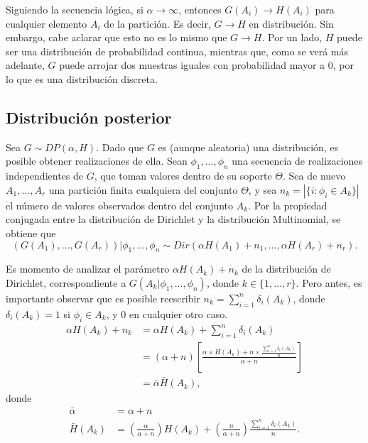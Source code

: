 Siguiendo la secuencia l\'ogica, si $\alpha \rightarrow \infty$, entonces $G(A_i) \rightarrow H(A_i)$ para cualquier elemento $A_i$ de la partici\'on. Es decir, $G \rightarrow H$ en distribuci\'on. Sin embargo, cabe aclarar que esto no es lo mismo que $G \rightarrow H$. Por un lado, $H$ puede ser una distribuci\'on de probabilidad continua, mientras que, como se ver\'a m\'as adelante, $G$ puede arrojar dos muestras iguales con probabilidad mayor a 0, por lo que es una distribuci\'on discreta.

\subsection{Distribuci\'on posterior}

Sea $G \sim DP(\alpha,H)$. Dado que $G$ es (aunque aleatoria) una distribuci\'on, es posible obtener realizaciones de ella. Sean $\phi_1,..., \phi_n$ una secuencia de realizaciones independientes de $G$, que toman valores dentro de su soporte $\Theta$. Sea de nuevo $A_1,...,A_r$ una partici\'on finita cualquiera del conjunto $\Theta$, y sea $n_k = |\{i: \phi_i \in A_k\}|$ el n\'umero de valores observados dentro del conjunto $A_k$. Por la propiedad conjugada entre la distribuci\'on de Dirichlet y la distribuci\'on Multinomial, se obtiene que
\begin{equation*}
   (G(A_1),...,G(A_r))|\phi_1,...,\phi_n \sim Dir(\alpha H(A_1) + n_1,...,\alpha H(A_r) + n_r). 
\end{equation*}

Es momento de analizar el par\'ametro $\alpha H(A_k) + n_k$ de la distribuci\'on de Dirichlet, correspondiente a $G(A_k|\phi_1,...,\phi_n)$, donde $k \in \{1,...,r\}$. Pero antes, es importante observar que es posible reescribir $n_k = \sum_{i=1}^n \delta_i(A_k)$, donde $\delta_i(A_k) = 1$ si $\phi_i \in A_k$, y $0$ en cualquier otro caso. 
\begin{equation*}
\begin{aligned}
    \alpha H(A_k) + n_k 
    &= \alpha H(A_k) + \sum_{i=1}^n \delta_i(A_k) \\
    &= (\alpha + n)
    \left[
        \frac{\alpha \times H(A_k) + n \times \frac{\sum_{i=1}^n \delta_i(A_k)}{n}}{\alpha + n}
    \right] \\
    &= \bar{\alpha} \bar{H}(A_k),
\end{aligned}
\end{equation*}
donde
\begin{equation*}
\begin{aligned}
    \bar{\alpha} &= \alpha + n \\
    \bar{H}(A_k) &=  
        \left(\frac{\alpha}{\alpha + n}\right)H(A_k) + 
        \left(\frac{n}{\alpha + n}\right)\frac{\sum_{i=1}^n \delta_i(A_k)}{n}.
\end{aligned}
\end{equation*}

